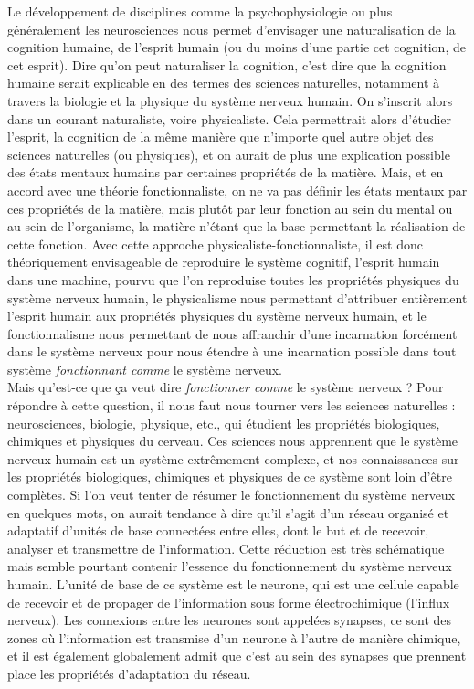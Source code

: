 \documentclass[12pt]{scrartcl}
\begin{document}
Le développement de disciplines comme la psychophysiologie ou plus généralement les neurosciences nous permet d'envisager une naturalisation de la cognition humaine, de l'esprit humain (ou du moins d'une partie cet cognition, de cet esprit). Dire qu'on peut naturaliser la cognition, c'est dire que la cognition humaine serait explicable en des termes des sciences naturelles, notamment à travers la biologie et la physique du système nerveux humain. On s'inscrit alors dans un courant naturaliste, voire physicaliste. Cela permettrait alors d'étudier l'esprit, la cognition de la même manière que n'importe quel autre objet des sciences naturelles (ou physiques), et on aurait de plus une explication possible des états mentaux humains par certaines propriétés de la matière. Mais, et en accord avec une théorie fonctionnaliste, on ne va pas définir les états mentaux par ces propriétés de la matière, mais plutôt par leur fonction au sein du mental ou au sein de l'organisme, la matière n'étant que la base permettant la réalisation de cette fonction. Avec cette approche physicaliste-fonctionnaliste, il est donc théoriquement envisageable de reproduire le système cognitif, l'esprit humain dans une machine, pourvu que l'on reproduise toutes les propriétés physiques du système nerveux humain, le physicalisme nous permettant d'attribuer entièrement l'esprit humain aux propriétés physiques du système nerveux humain, et le fonctionnalisme nous permettant de nous affranchir d'une incarnation forcément dans le système nerveux pour nous étendre à une incarnation possible dans tout système \textit{fonctionnant comme} le système nerveux. \\

Mais qu'est-ce que ça veut dire \textit{fonctionner comme} le système nerveux ? Pour répondre à cette question, il nous faut nous tourner vers les sciences naturelles : neurosciences, biologie, physique, etc., qui étudient les propriétés biologiques, chimiques et physiques du cerveau. Ces sciences nous apprennent que le système nerveux humain est un système extrêmement complexe, et nos connaissances sur les propriétés biologiques, chimiques et physiques de ce système sont loin d'être complètes. Si l'on veut tenter de résumer le fonctionnement du système nerveux en quelques mots, on aurait tendance à dire qu'il s'agit d’un réseau organisé et adaptatif d'unités de base connectées entre elles, dont le but et de recevoir, analyser et transmettre de l'information. Cette réduction est très schématique mais semble pourtant contenir l'essence du fonctionnement du système nerveux humain. L'unité de base de ce système est le neurone, qui est une cellule capable de recevoir et de propager de l'information sous forme électrochimique (l'influx nerveux). Les connexions entre les neurones sont appelées synapses, ce sont des zones où l'information est transmise d'un neurone à l'autre de manière chimique, et il est également globalement admit que c'est au sein des synapses que prennent place les propriétés d'adaptation du réseau.\\
\end{document}
